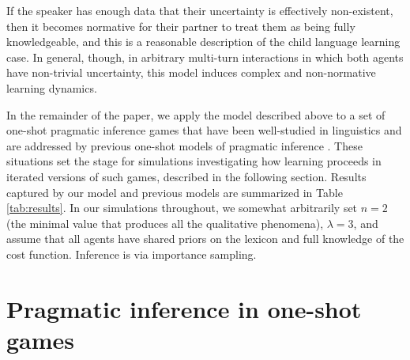 \documentclass{article} %
\newcommand{\word}{\text{word}}
\newcommand{\obj}{\text{object}}
\newcommand{\lex}{\text{lexicon}}
\begin{document}
If the speaker has enough data that their
uncertainty is effectively non-existent, then it becomes normative for
their partner to treat them as being fully knowledgeable, and this is
a reasonable description of the child language learning case. In
general, though, in arbitrary multi-turn interactions in which both
agents have non-trivial uncertainty, this model induces complex and
non-normative learning dynamics. 

In the remainder of the paper, we apply the model described above to a set of one-shot
pragmatic inference games that have been well-studied in linguistics
\cite{grice1975,horn1984} and are addressed by previous one-shot
models of pragmatic inference \cite{frank2012,bergen2012}. These
situations set the stage for simulations investigating how learning
proceeds in iterated versions of such games, described in the
following section. Results captured by our model and previous models
are summarized in Table \ref{tab:results}. In
  our simulations throughout, we somewhat arbitrarily set $n = 2$ (the
  minimal value that produces all the qualitative phenomena), $\lambda
  = 3$, and assume that all agents have shared priors on the lexicon
  and full knowledge of the cost function. Inference is via importance
  sampling.

%
%
%
%
%

\section{Pragmatic inference in one-shot games}
\end{document}
